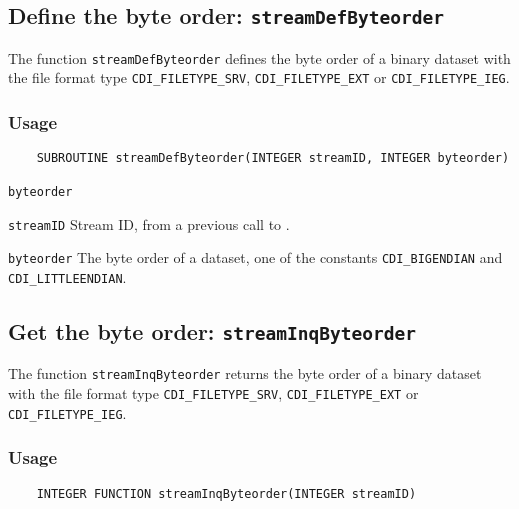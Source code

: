 \subsection{Define the byte order: \texttt{streamDefByteorder}}
\label{streamDefByteorder}

The function {\texttt{streamDefByteorder}} defines the byte order of a binary dataset
with the file format type {\texttt{CDI\_FILETYPE\_SRV}}, {\texttt{CDI\_FILETYPE\_EXT}} or {\texttt{CDI\_FILETYPE\_IEG}}.

\subsubsection*{Usage}

\begin{verbatim}
    SUBROUTINE streamDefByteorder(INTEGER streamID, INTEGER byteorder)
\end{verbatim}

\hspace*{4mm}\begin{minipage}[]{15cm}
\begin{deflist}{\texttt{byteorder}\ }
\item[\texttt{streamID}]
Stream ID, from a previous call to {}.
\item[\texttt{byteorder}]
The byte order of a dataset, one of the {\CDI} constants {\texttt{CDI\_BIGENDIAN}} and
                     {\texttt{CDI\_LITTLEENDIAN}}.

\end{deflist}
\end{minipage}


\subsection{Get the byte order: \texttt{streamInqByteorder}}
\label{streamInqByteorder}

The function {\texttt{streamInqByteorder}} returns the byte order of a binary dataset
with the file format type {\texttt{CDI\_FILETYPE\_SRV}}, {\texttt{CDI\_FILETYPE\_EXT}} or {\texttt{CDI\_FILETYPE\_IEG}}.

\subsubsection*{Usage}

\begin{verbatim}
    INTEGER FUNCTION streamInqByteorder(INTEGER streamID)
\end{verbatim}

